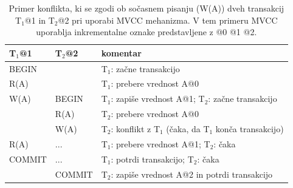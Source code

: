 \documentclass[a4paper, 12pt]{book}
\begin{document}
\begin{table}[H]
\begin{center}
\begin{tabular}{p{}|p{}|p{}} 
    \textbf{T$_{\text{1}}$@1} & \textbf{T$_{\text{2}}$@2} & \textbf{komentar} \\
\hline
BEGIN  &        & T$_{\text{1}}$: začne transakcijo \\
R(A)   &        & T$_{\text{1}}$: prebere vrednost A@0 \\
W(A)   & BEGIN  & T$_{\text{1}}$: zapiše vrednost A@1; T$_{\text{2}}$: začne transakcijo \\
       & R(A)   & T$_{\text{2}}$: prebere vrednost A@0  \\
       & W(A)   & T$_{\text{2}}$: konflikt z T$_{\text{1}}$ (čaka, da T$_{\text{1}}$ konča transakcijo) \\
R(A)   & ...    & T$_{\text{1}}$: prebere vrednost A@1; T$_{\text{2}}$: čaka \\
COMMIT & ...    & T$_{\text{1}}$: potrdi transakcijo; T$_{\text{2}}$: čaka \\
       & COMMIT & T$_{\text{2}}$: zapiše vrednost A@2 in potrdi transakcijo \\
\end{tabular}
\end{center}
\caption{Primer \cite{lecture-mvcc} konflikta, ki se zgodi ob sočasnem pisanju (W(A)) dveh transakcij T$_{\text{1}}$@1 in T$_{\text{2}}$@2 pri uporabi MVCC mehanizma. V tem primeru MVCC uporablja inkrementalne oznake predstavljene z @0 @1 @2.}
\label{tbl_cc_mvcc_example}
\end{table}
\end{document}
